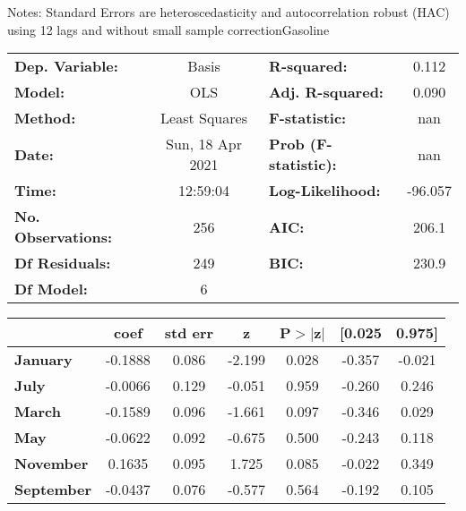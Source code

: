 Notes: \newline
 [1] Standard Errors are heteroscedasticity and autocorrelation robust (HAC) using 12 lags and without small sample correctionGasoline\begin{center}
\begin{tabular}{lclc}
\toprule
\textbf{Dep. Variable:}    &      Basis       & \textbf{  R-squared:         } &     0.112   \\
\textbf{Model:}            &       OLS        & \textbf{  Adj. R-squared:    } &     0.090   \\
\textbf{Method:}           &  Least Squares   & \textbf{  F-statistic:       } &       nan   \\
\textbf{Date:}             & Sun, 18 Apr 2021 & \textbf{  Prob (F-statistic):} &      nan    \\
\textbf{Time:}             &     12:59:04     & \textbf{  Log-Likelihood:    } &   -96.057   \\
\textbf{No. Observations:} &         256      & \textbf{  AIC:               } &     206.1   \\
\textbf{Df Residuals:}     &         249      & \textbf{  BIC:               } &     230.9   \\
\textbf{Df Model:}         &           6      & \textbf{                     } &             \\
\bottomrule
\end{tabular}
\begin{tabular}{lcccccc}
                   & \textbf{coef} & \textbf{std err} & \textbf{z} & \textbf{P$> |$z$|$} & \textbf{[0.025} & \textbf{0.975]}  \\
\midrule
\textbf{January}   &      -0.1888  &        0.086     &    -2.199  &         0.028        &       -0.357    &       -0.021     \\
\textbf{July}      &      -0.0066  &        0.129     &    -0.051  &         0.959        &       -0.260    &        0.246     \\
\textbf{March}     &      -0.1589  &        0.096     &    -1.661  &         0.097        &       -0.346    &        0.029     \\
\textbf{May}       &      -0.0622  &        0.092     &    -0.675  &         0.500        &       -0.243    &        0.118     \\
\textbf{November}  &       0.1635  &        0.095     &     1.725  &         0.085        &       -0.022    &        0.349     \\
\textbf{September} &      -0.0437  &        0.076     &    -0.577  &         0.564        &       -0.192    &        0.105     \\

\end{tabular}
\end{center}

